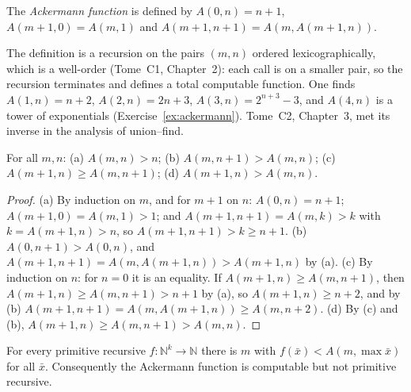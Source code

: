 \begin{definition}\label{def:ackermann}
The \emph{Ackermann function} is defined by $A(0,n)=n+1$, $A(m+1,0)=A(m,1)$ and $A(m+1,n+1)=A(m,A(m+1,n))$.
\end{definition}

The definition is a recursion on the pairs $(m,n)$ ordered lexicographically, which is a well-order (Tome~C1, Chapter~2): each call is on a smaller pair, so the recursion terminates and defines a total computable function. One finds $A(1,n)=n+2$, $A(2,n)=2n+3$, $A(3,n)=2^{n+3}-3$, and $A(4,n)$ is a tower of exponentials (Exercise~\ref{ex:ackermann}). Tome~C2, Chapter~3, met its inverse in the analysis of union--find.

\begin{lemma}\label{lem:ackmono}
For all $m,n$: (a) $A(m,n)>n$; (b) $A(m,n+1)>A(m,n)$; (c) $A(m+1,n)\ge A(m,n+1)$; (d) $A(m+1,n)>A(m,n)$.
\end{lemma}

\begin{proof}
(a) By induction on $m$, and for $m+1$ on $n$: $A(0,n)=n+1$; $A(m+1,0)=A(m,1)>1$; and $A(m+1,n+1)=A(m,k)>k$ with $k=A(m+1,n)>n$, so $A(m+1,n+1)>k\ge n+1$.
(b) $A(0,n+1)>A(0,n)$, and $A(m+1,n+1)=A(m,A(m+1,n))>A(m+1,n)$ by (a).
(c) By induction on $n$: for $n=0$ it is an equality. If $A(m+1,n)\ge A(m,n+1)$, then $A(m+1,n)\ge A(m,n+1)>n+1$ by (a), so $A(m+1,n)\ge n+2$, and by (b) $A(m+1,n+1)=A(m,A(m+1,n))\ge A(m,n+2)$.
(d) By (c) and (b), $A(m+1,n)\ge A(m,n+1)>A(m,n)$.
\end{proof}

\begin{theorem}[Ackermann, 1928]\label{thm:ackermann}
For every primitive recursive $f:\mathbb N^k\to\mathbb N$ there is $m$ with $f(\bar x)<A(m,\max\bar x)$ for all $\bar x$. Consequently the Ackermann function is computable but not primitive recursive.
\end{theorem}

